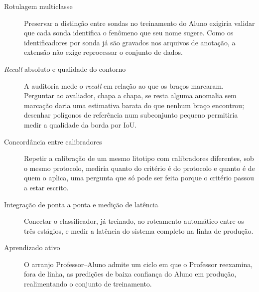 \begin{description}
  \item[Rotulagem multiclasse] Preservar a distinção entre sondas no treinamento do Aluno exigiria validar que cada sonda identifica o fenômeno que seu nome sugere. Como os identificadores por sonda já são gravados nos arquivos de anotação, a extensão não exige reprocessar o conjunto de dados.

  \item[\textit{Recall} absoluto e qualidade do contorno] A auditoria mede o \textit{recall} em relação ao que os braços marcaram. Perguntar ao avaliador, chapa a chapa, se resta alguma anomalia sem marcação daria uma estimativa barata do que nenhum braço encontrou; desenhar polígonos de referência num subconjunto pequeno permitiria medir a qualidade da borda por IoU.

  \item[Concordância entre calibradores] Repetir a calibração de um mesmo litotipo com calibradores diferentes, sob o mesmo protocolo, mediria quanto do critério é do protocolo e quanto é de quem o aplica, uma pergunta que só pode ser feita porque o critério passou a estar escrito.

  \item[Integração de ponta a ponta e medição de latência] Conectar o classificador, já treinado, ao roteamento automático entre os três estágios, e medir a latência do sistema completo na linha de produção.

  \item[Aprendizado ativo] O arranjo Professor--Aluno admite um ciclo em que o Professor reexamina, fora de linha, as predições de baixa confiança do Aluno em produção, realimentando o conjunto de treinamento.

\end{description}
